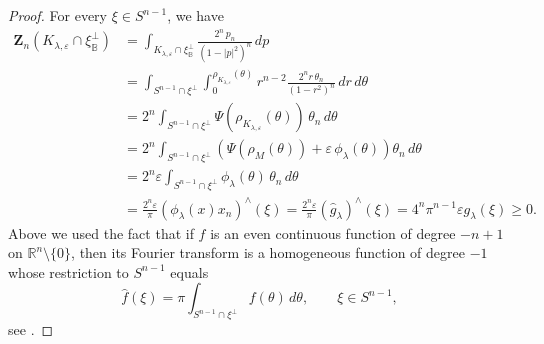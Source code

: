 \documentclass[12pt,letterpaper,reqno]{amsart}
\theoremstyle{definition}
\begin{document}
\begin{proof}
	 
	 
	
	
	
	
For every $\xi\in S^{n-1}$,	we   have 	
	\begin{align*}
		\bm{Z}_n(K_{\lambda,\varepsilon}\cap\xi_{\mathbb{B}}^\perp)
		&= \int_{K_{\lambda,\varepsilon}\cap\xi_{\mathbb{B}}^\perp}\frac{2^{n}\,p_n}{(1-|p|^2)^{n}}\,dp \\
		&= \int_{S^{n-1}\cap\xi^\perp}\int_0^{\rho_{K_{\lambda,\varepsilon}}(\theta)} r^{n-2} \frac{2^{n}r \, \theta_n}{(1-r^2)^{n}}\,dr\, d\theta\\
		&= 2^n\int_{S^{n-1}\cap\xi^\perp}  \Psi(\rho_{K_{\lambda,\varepsilon}}(\theta))  \, \theta_n \, d\theta\\
		&= 2^n\int_{S^{n-1}\cap\xi^\perp}  \left( \Psi(\rho_M(\theta))+\varepsilon\,\phi_\lambda(\theta)\right)   \theta_n \, d\theta\\
		&= 2^n \varepsilon\int_{S^{n-1}\cap\xi^\perp}  \phi_\lambda(\theta)   \, \theta_n \, d\theta\\
		& = \frac{2^n \varepsilon}{\pi} \left(\phi_\lambda(x) x_n\right)^\wedge (\xi)  = \frac{2^n \varepsilon}{\pi} \left(\widehat g_\lambda \right)^\wedge (\xi) = 4^n\pi^{n-1}\varepsilon g_{\lambda}(\xi)\ge 0.
	\end{align*}
	Above we used the fact that if $f$ is an even continuous function of degree $-n+1$ on $\mathbb R^n\setminus\{0\}$, then its Fourier transform is a homogeneous function of degree $-1$ whose restriction to $S^{n-1}$ equals $$\widehat f (\xi) = \pi \int_{S^{n-1}\cap \xi^\perp} f(\theta)\, d\theta,\qquad \xi\in S^{n-1},$$
	see \cite[Lemma 3.7]{K}.
	

\end{proof}
\end{document}
